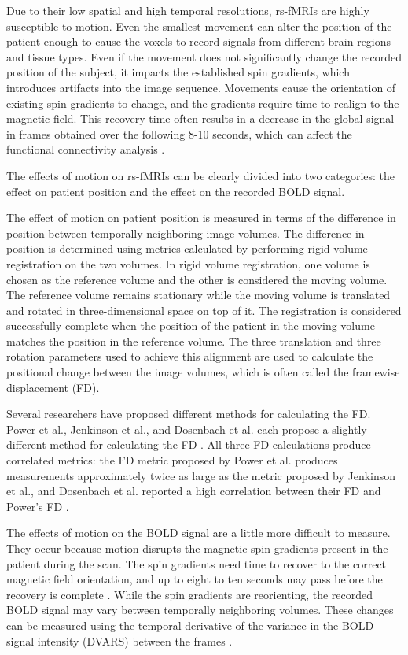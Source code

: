 Due to their low spatial and high temporal resolutions, rs-fMRIs are highly susceptible to motion. Even the smallest movement can alter the position of the patient enough to cause the voxels to record signals from different brain regions and tissue types. Even if the movement does not significantly change the recorded position of the subject, it impacts the established spin gradients, which introduces artifacts into the image sequence. Movements cause the orientation of existing spin gradients to change, and the gradients require time to realign to the magnetic field. This recovery time often results in a decrease in the global signal in frames obtained over the following 8-10 seconds, which can affect the functional connectivity analysis \cite{Power2014}.

The effects of motion on rs-fMRIs can be clearly divided into two categories: the effect on patient position and the effect on the recorded BOLD signal.

The effect of motion on patient position is measured in terms of the difference in position between temporally neighboring image volumes. The difference in position is determined using metrics calculated by performing rigid volume registration on the two volumes. 
In rigid volume registration, one volume is chosen as the reference volume and the other is considered the moving volume. The reference volume remains stationary while the moving volume is translated and rotated in three-dimensional space on top of it. The registration is considered successfully complete when the position of the patient in the moving volume matches the position in the reference volume. The three translation and three rotation parameters used to achieve this alignment are used to calculate the positional change between the image volumes, which is often called the framewise displacement (FD). 

Several researchers have proposed different methods for calculating the FD. Power et al., Jenkinson et al., and Dosenbach et al. each propose a slightly different method for calculating the FD \cite{Power2012} \cite{Jenkinson2002} \cite{Dosenbach2017}. All three FD calculations produce correlated metrics: the FD metric proposed by Power et al. produces measurements approximately twice as large as the metric proposed by Jenkinson et al., and Dosenbach et al. reported a high correlation between their FD and Power’s FD \cite{Yan2013a} \cite{Dosenbach2017}. 

The effects of motion on the BOLD signal are a little more difficult to measure. They occur because motion disrupts the magnetic spin gradients present in the patient during the scan. The spin gradients need time to recover to the correct magnetic field orientation, and up to eight to ten seconds may pass before the recovery is complete \cite{Power2014}. While the spin gradients are reorienting, the recorded BOLD signal may vary between temporally neighboring volumes. These changes can be measured using the temporal derivative of the variance in the BOLD signal intensity (DVARS) between the  frames \cite{Power2012} \cite{Smyser2015}.

